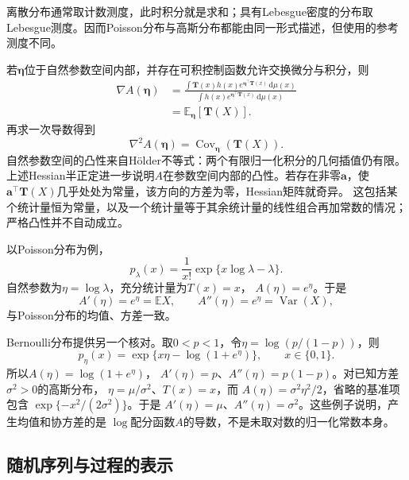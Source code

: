离散分布通常取计数测度，此时积分就是求和；具有Lebesgue密度的分布取Lebesgue测度。因而Poisson分布与高斯分布都能由同一形式描述，但使用的参考测度不同。

若\(\bm{\eta}\)位于自然参数空间内部，并存在可积控制函数允许交换微分与积分，则
\[
\begin{aligned}
  \nabla A(\bm{\eta})
  &=
  \frac{\int \bm{T}(x)h(x)
  e^{\bm{\eta}^{\top}\bm{T}(x)}\,\mathrm{d}\mu(x)}
  {\int h(x)e^{\bm{\eta}^{\top}\bm{T}(x)}\,\mathrm{d}\mu(x)}\\
  &=
  \mathbb{E}_{\bm{\eta}}[\bm{T}(X)].
\end{aligned}
\]
再求一次导数得到
\begin{equation}
  \nabla^2 A(\bm{\eta})
  =
  \operatorname{Cov}_{\bm{\eta}}(\bm{T}(X)).
  \label{eq:probability-log-partition-hessian}
\end{equation}
自然参数空间的凸性来自Hölder不等式：两个有限归一化积分的几何插值仍有限。上述Hessian半正定进一步说明\(A\)在参数空间内部的凸性。若存在非零\(\bm a\)，使
\(\bm a^\top\bm T(X)\)几乎处处为常量，该方向的方差为零，Hessian矩阵就奇异。
这包括某个统计量恒为常量，以及一个统计量等于其余统计量的线性组合再加常数的情况；
严格凸性并不自动成立。

以Poisson分布为例，
\[ p_\lambda(x)
  =\frac{1}{x!}\exp\{x\log\lambda-\lambda\}. \]
自然参数为\(\eta=\log\lambda\)，充分统计量为\(T(x)=x\)，
\(A(\eta)=e^\eta\)。于是
\[ A'(\eta)=e^\eta=\mathbb{E}X,
  \qquad A''(\eta)=e^\eta=\operatorname{Var}(X), \]
与Poisson分布的均值、方差一致。

Bernoulli分布提供另一个核对。取\(0<p<1\)，令\(\eta=\log(p/(1-p))\)，则
\[
  p_\eta(x)=\exp\{x\eta-\log(1+e^\eta)\},
  \qquad x\in\{0,1\}.
\]
所以\(A(\eta)=\log(1+e^\eta)\)，
\(A'(\eta)=p\)、\(A''(\eta)=p(1-p)\)。对已知方差\(\sigma^2>0\)的高斯分布，
\(\eta=\mu/\sigma^2\)、\(T(x)=x\)，而
\(A(\eta)=\sigma^2\eta^2/2\)，省略的基准项包含
\(\exp\{-x^2/(2\sigma^2)\}\)。于是
\(A'(\eta)=\mu\)、\(A''(\eta)=\sigma^2\)。这些例子说明，产生均值和协方差的是
\(\log\)配分函数\(A\)的导数，不是未取对数的归一化常数本身。

\subsection{随机序列与过程的表示}
\label{sec:rv-sequences-processes}
\label{sec:stoch-process-joint-laws}
\label{sec:rv-sequences}

